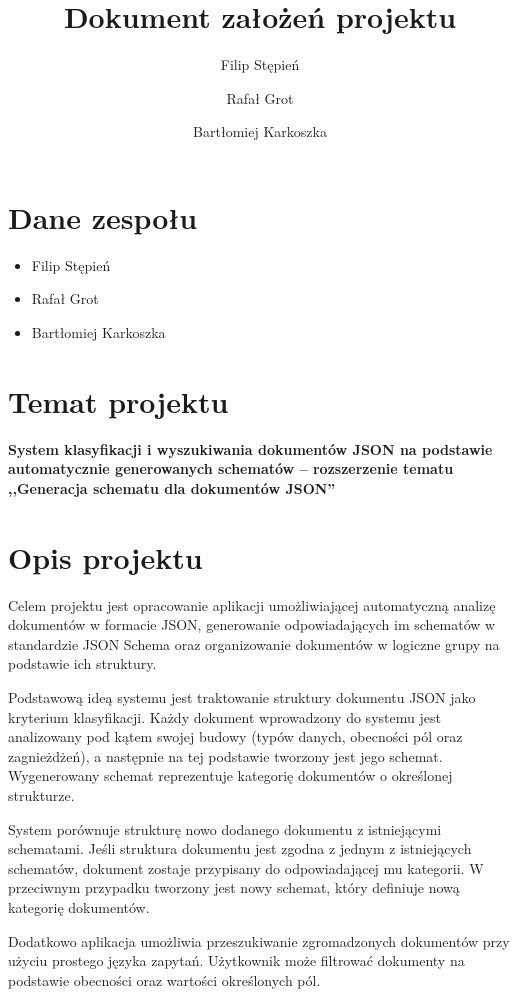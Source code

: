 \documentclass[a4paper,12pt]{article}
\title{Dokument założeń projektu}
\author{Filip Stępień \and Rafał Grot \and Bartłomiej Karkoszka}
\date{}
\begin{document}
\maketitle

\section{Dane zespołu}

\begin{itemize}
  \item Filip Stępień
  \item Rafał Grot
  \item Bartłomiej Karkoszka
\end{itemize}

\section{Temat projektu}

\textbf{System klasyfikacji i wyszukiwania dokumentów JSON na podstawie automatycznie generowanych schematów -- rozszerzenie tematu ,,Generacja schematu dla dokumentów JSON''}

\section{Opis projektu}

Celem projektu jest opracowanie aplikacji umożliwiającej automatyczną analizę dokumentów w formacie JSON, generowanie odpowiadających im schematów w standardzie JSON Schema oraz organizowanie dokumentów w logiczne grupy na podstawie ich struktury.

Podstawową ideą systemu jest traktowanie struktury dokumentu JSON jako kryterium klasyfikacji. Każdy dokument wprowadzony do systemu jest analizowany pod kątem swojej budowy (typów danych, obecności pól oraz zagnieżdżeń), a następnie na tej podstawie tworzony jest jego schemat. Wygenerowany schemat reprezentuje kategorię dokumentów o określonej strukturze.

System porównuje strukturę nowo dodanego dokumentu z istniejącymi schematami. Jeśli struktura dokumentu jest zgodna z jednym z istniejących schematów, dokument zostaje przypisany do odpowiadającej mu kategorii. W przeciwnym przypadku tworzony jest nowy schemat, który definiuje nową kategorię dokumentów.

Dodatkowo aplikacja umożliwia przeszukiwanie zgromadzonych dokumentów przy użyciu prostego języka zapytań. Użytkownik może filtrować dokumenty na podstawie obecności oraz wartości określonych pól.
\end{document}
